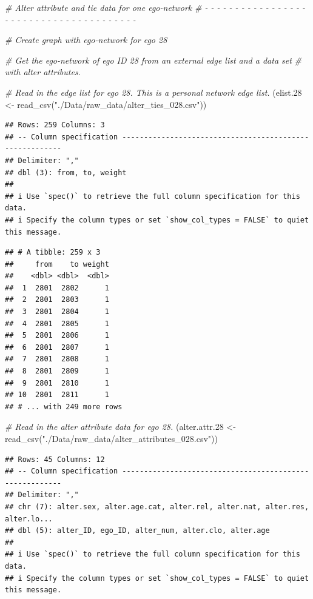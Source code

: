\documentclass[
]{book}
\newenvironment{Shaded}{\begin{snugshade}}{\end{snugshade}}
\newcommand{\CommentTok}[1]{\textcolor[rgb]{0.56,0.35,0.01}{\textit{#1}}}
\newcommand{\FloatTok}[1]{\textcolor[rgb]{0.00,0.00,0.81}{#1}}
\newcommand{\FunctionTok}[1]{\textcolor[rgb]{0.00,0.00,0.00}{#1}}
\newcommand{\NormalTok}[1]{#1}
\newcommand{\OtherTok}[1]{\textcolor[rgb]{0.56,0.35,0.01}{#1}}
\newcommand{\StringTok}[1]{\textcolor[rgb]{0.31,0.60,0.02}{#1}}
\begin{document}
\begin{Shaded}
\begin{Highlighting}[]
\CommentTok{\# Alter attribute and tie data for one ego{-}network}
\CommentTok{\# {-} {-} {-} {-} {-} {-} {-} {-} {-} {-} {-} {-} {-} {-} {-} {-} {-} {-} {-} {-} {-} {-} {-} {-} {-} {-} {-} {-} {-} {-} {-} {-} {-} {-} {-} {-} {-} {-} {-}}

\CommentTok{\# Create graph with ego{-}network for ego 28}

\CommentTok{\# Get the ego{-}network of ego ID 28 from an external edge list and a data set}
\CommentTok{\# with alter attributes.}

\CommentTok{\# Read in the edge list for ego 28. This is a personal network edge list.}
\NormalTok{(elist}\FloatTok{.28} \OtherTok{\textless{}{-}} \FunctionTok{read\_csv}\NormalTok{(}\StringTok{"./Data/raw\_data/alter\_ties\_028.csv"}\NormalTok{))}
\end{Highlighting}
\end{Shaded}

\begin{verbatim}
## Rows: 259 Columns: 3
## -- Column specification --------------------------------------------------------
## Delimiter: ","
## dbl (3): from, to, weight
## 
## i Use `spec()` to retrieve the full column specification for this data.
## i Specify the column types or set `show_col_types = FALSE` to quiet this message.
\end{verbatim}

\begin{verbatim}
## # A tibble: 259 x 3
##     from    to weight
##    <dbl> <dbl>  <dbl>
##  1  2801  2802      1
##  2  2801  2803      1
##  3  2801  2804      1
##  4  2801  2805      1
##  5  2801  2806      1
##  6  2801  2807      1
##  7  2801  2808      1
##  8  2801  2809      1
##  9  2801  2810      1
## 10  2801  2811      1
## # ... with 249 more rows
\end{verbatim}

\begin{Shaded}
\begin{Highlighting}[]
\CommentTok{\# Read in the alter attribute data for ego 28. }
\NormalTok{(alter.attr}\FloatTok{.28} \OtherTok{\textless{}{-}} \FunctionTok{read\_csv}\NormalTok{(}\StringTok{"./Data/raw\_data/alter\_attributes\_028.csv"}\NormalTok{))}
\end{Highlighting}
\end{Shaded}

\begin{verbatim}
## Rows: 45 Columns: 12
## -- Column specification --------------------------------------------------------
## Delimiter: ","
## chr (7): alter.sex, alter.age.cat, alter.rel, alter.nat, alter.res, alter.lo...
## dbl (5): alter_ID, ego_ID, alter_num, alter.clo, alter.age
## 
## i Use `spec()` to retrieve the full column specification for this data.
## i Specify the column types or set `show_col_types = FALSE` to quiet this message.
\end{verbatim}
\end{document}
